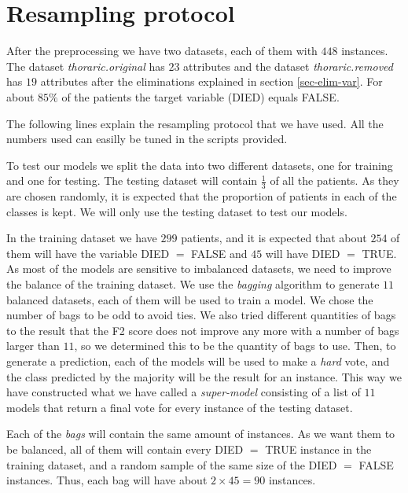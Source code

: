 \section{Resampling protocol}

After the preprocessing we have two datasets, each of them with $448$ instances. The dataset \textit{thoraric.original} has $23$ attributes and the dataset \textit{thoraric.removed} has $19$ attributes after the eliminations explained in section \ref{sec-elim-var}. For about $85\%$ of the patients the target variable (DIED) equals FALSE.

The following lines explain the resampling protocol that we have used. All the numbers used can easilly be tuned in the scripts provided.

To test our models we split the data into two different datasets, one for training and one for testing. The testing dataset will contain $\frac{1}{3}$ of all the patients. As they are chosen randomly, it is expected that the proportion of patients in each of the classes is kept. We will only use the testing dataset to test our models.

In the training dataset we have $299$ patients, and it is expected that about $254$ of them will have the variable DIED $=$ FALSE and $45$ will have DIED $=$ TRUE.
As most of the models are sensitive to imbalanced datasets, we need to improve the balance of the training dataset. We use the \textit{bagging} algorithm to generate $11$ balanced datasets, each of them will be used to train a model. We chose the number of bags to be odd to avoid ties. We also tried different quantities of bags to the result that the F2 score does not improve any more with a number of bags larger than $11$, so we determined this to be the quantity of bags to use. Then, to generate a prediction, each of the models will be used to make a \textit{hard} vote, and the class predicted by the majority will be the result for an instance. This way we have constructed what we have called a \textit{super-model} consisting of a list of $11$ models that return a final vote for every instance of the testing dataset.

Each of the \textit{bags} will contain the same amount of instances. As we want them to be balanced, all of them will contain every DIED $=$ TRUE instance in the training dataset, and a random sample of the same size of the DIED $=$ FALSE instances. Thus, each bag will have about $2 \times 45 = 90$ instances.
